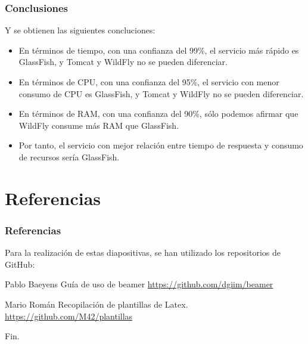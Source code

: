 \documentclass[compress, aspectratio=169]{beamer} %
\begin{document}
	\begin{frame}
		\frametitle{Conclusiones}
		
		Y se obtienen las siguientes concluciones:
		
		\begin{itemize}
			\item En términos de tiempo, con una confianza del 99\%, el servicio más rápido es GlassFish, y
			Tomcat y WildFly no se pueden diferenciar.
			\item En términos de CPU, con una confianza del 95\%, el servicio con menor consumo de CPU es GlassFish,
			y Tomcat y WildFly no se pueden diferenciar.
			\item En términos de RAM, con una confianza del 90\%, sólo podemos afirmar que WildFly consume más RAM que GlassFish.
			\item Por tanto, el servicio con mejor relación entre tiempo de respuesta y consumo de recursos sería GlassFish.
		\end{itemize} 
	\end{frame}

\section{Referencias}
	\begin{frame}
		\frametitle{Referencias}
		
		Para la realización de estas diapositivas, se han utilizado los repositorios de GitHub:
		
		\footnotesize{
		  \begin{thebibliography}{7} %
		     Pablo Baeyens
		      \newblock Guía de uso de beamer
		      \newblock \url{https://github.com/dgiim/beamer}
		      
		     Mario Román
		      \newblock Recopilación de plantillas de Latex.
		      \newblock \url{https://github.com/M42/plantillas}
		  \end{thebibliography}
		}
	\end{frame}


\begin{frame}
\Huge{\centerline{Fin.}}
\end{frame}

\end{document}
